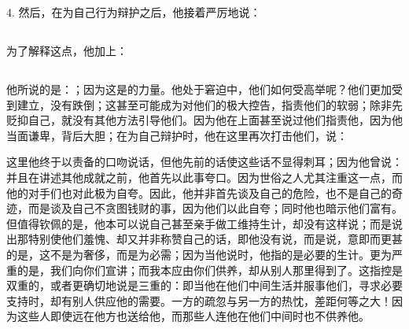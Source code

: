 4. 然后，在为自己行为辩护之后，他接着严厉地说：\par


\subsection{}

\par

为了解释这点，他加上：\par


\subsection{}

\par

他所说的是：；因为这是的力量。他处于窘迫中，他们如何受高举呢？他们更加受到建立，没有跌倒；这甚至可能成为对他们的极大控告，指责他们的软弱；除非先贬抑自己，就没有其他方法引导他们。因为他在上面甚至说过他们指责他，因为他当面谦卑，背后大胆；在为自己辩护时，他在这里再次打击他们，说：\par

这里他终于以责备的口吻说话，但他先前的话使这些话不显得刺耳；因为他曾说：并且在讲述其他成就之前，他首先以此事夸口。因为世俗之人尤其注重这一点，而他的对手们也对此极为自夸。因此，他并非首先谈及自己的危险，也不是自己的奇迹，而是谈及自己不贪图钱财的事，因为他们以此自夸；同时他也暗示他们富有。但值得钦佩的是，他本可以说自己甚至亲手做工维持生计，却没有这样说；而是说出那特别使他们羞愧、却又并非称赞自己的话，即他没有说，而是说，意即而更甚的是，这不是为奢侈，而是为必需；因为当他说时，他指的是必要的生计。更为严重的是，我们向你们宣讲；而我本应由你们供养，却从别人那里得到了。这指控是双重的，或者更确切地说是三重的：即当他在他们中间生活并服事他们，寻求必要支持时，却有别人供应他的需要。一方的疏忽与另一方的热忱，差距何等之大！因为这些人即使远在他方也送给他，而那些人连他在他们中间时也不供养他。\par

